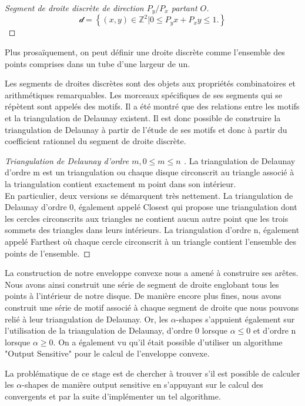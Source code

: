 \begin{proof}[Segment de droite discrète de direction $P_y / P_x$ partant $O$]
    $$\mathcal{d} =  \left\{ (x,y) \in \mathbb{Z}^{2} |  0 \leq P_y x + P_x y \leq 1. \right\}$$
\end{proof}

Plus prosaïquement, on peut définir une droite discrète comme l'ensemble des points comprises dans un tube d'une largeur de un.


Les segments de droites discrètes sont des objets aux propriétés combinatoires et arithmétiques remarquables. Les morceaux spécifiques de ses segments qui se répètent sont appelés des motifs. Il a été montré que des relations entre les motifs et la triangulation de Delaunay existent. Il est donc possible de construire la triangulation de Delaunay à partir de l'étude de ses motifs et donc à partir du coefficient rationnel du segment de droite discrète.

\begin{proof}[Triangulation de Delaunay d'ordre $m, 0 \leq m \leq n$ ]
  La triangulation de Delaunay d'ordre m est un triangulation ou chaque disque circonscrit au triangle associé à la triangulation contient exactement m point dans son intérieur.\\
 
  En particulier, deux versions se démarquent très nettement. La triangulation de Delaunay d'ordre 0, également appelé Closest qui propose une triangulation dont les cercles circonscrits aux triangles ne contient aucun autre point que les trois sommets des triangles dans leurs intérieurs. La triangulation d'ordre n, également appelé Farthest où chaque cercle circonscrit à un triangle contient l'ensemble des points de  l'ensemble.
\end{proof}

La construction de notre enveloppe convexe nous a amené à construire ses arêtes. Nous avons ainsi construit une série de segment de droite englobant tous les points à l'intérieur de notre disque. De manière encore plus fines, nous avons construit une série de motif associé à chaque segment de droite que nous pouvons relié à leur triangulation de Delaunay. Or, les $\alpha$-shapes s’appuient également sur l'utilisation de la triangulation de Delaunay, d'ordre 0 lorsque $\alpha \leq 0$ et d'ordre n lorsque $\alpha \geq 0$. On a également vu qu'il était possible d'utiliser un algorithme "Output Sensitive" pour le calcul de l'enveloppe convexe.

La problématique de ce stage est de chercher à trouver s'il est possible de calculer les $\alpha$-shapes de manière output sensitive en s'appuyant sur le calcul des convergents et par la suite d'implémenter un tel algorithme.  

